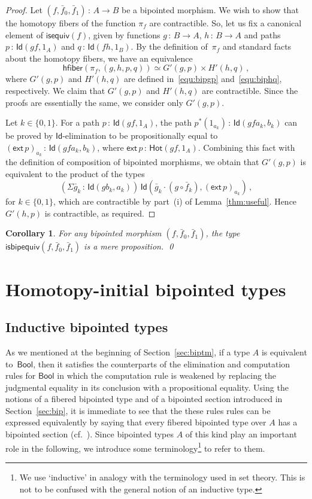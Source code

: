 \documentclass[10pt,a4paper,oneside,reqno]{amsart}
\numberwithin{equation}{section}
\theoremstyle{mythm}
\newtheorem{corollary}[theorem]{Corollary}
\theoremstyle{mydef}
\theoremstyle{myrmk}
\newcommand{\co}{\,{:}\,}
\newcommand{\ct}{\cdot}
\newcommand{\hfiber}{\mathsf{hfiber}}
\newcommand{\isequiv}{\mathsf{isequiv}}
\newcommand{\Hot}{\mathsf{Hot}}
\newcommand{\ext}{\mathsf{ext}}
\newcommand{\Bool}{\mathsf{Bool}}
\newcommand{\Id}{\mathsf{Id}}
\newcommand{\isbipequiv}{\mathsf{isbipequiv}}
\begin{document}
\begin{proof}
Let  $(f, \bar{f}_0, \bar{f}_1) \co A \to B$ be a bipointed morphism. We wish to show that the homotopy fibers
of the function $\pi_f$ are contractible. So, let us fix a canonical element of $\isequiv(f)$, given by functions $g \co B
\to A$, $h \co B \to A$ and paths $p \co \Id(gf, 1_A)$ and $q \co \Id(fh, 1_B)$. By the definition of~$\pi_f$ and standard
facts about the homotopy fibers, we have an equivalence 
\[
\hfiber(\pi_f, (g,h, p, q)) \simeq G'(g,p) \times H'(h,q) \, ,
\]
 where $G'(g,p)$ and $H'(h,q)$ are defined
in~\eqref{equ:bipgp} and~\eqref{equ:biphq}, respectively. 
We claim that $G'(g,p)$ and $H'(h,q)$ are contractible. Since
the proofs are essentially the same, we consider only $G'(g,p)$.  

Let $k \in \{0, 1 \}$. For a path $p \co \Id(gf, 1_A)$, the path $p^*(1_{a_k}) \co \Id( gf a_k, b_k)$ can be proved by $\Id$-elimination to be propositionally equal to $(\ext \, p)_{a_k}\co \Id(gfa_k, b_k)$, where $\ext \, p \co \Hot(gf, 1_A)$. Combining this fact with the definition of composition of bipointed morphisms, we obtain that
$G'(g,p)$ is equivalent to the product of the types
\[
(\Sigma \bar{g}_k \co \Id( gb_k, a_k)) \, \Id ( \bar{g}_k \ct (g \circ \bar{f}_k), (\ext \, p)_{a_k}) \, ,
\]
for $k \in \{0, 1 \}$, which are contractible by part~(i) of Lemma~\ref{thm:useful}. Hence $G'(h,p)$ is contractible, as required.
\end{proof}


\begin{corollary} For any bipointed morphism $(f, \bar{f}_0, \bar{f}_1)$, the type $\isbipequiv(f, \bar{f}_0, \bar{f}_1)$ is a mere proposition. \qed
\end{corollary} 





\section{Homotopy-initial bipointed types} 
\label{sec:homibt}


\subsection*{Inductive bipointed types} 
As we mentioned at the beginning of Section~\ref{sec:biptm}, if a type $A$ is equivalent to~$\Bool$, then 
it satisfies the counterparts of the elimination and computation rules for $\Bool$ in which the computation rule is 
weakened by replacing the judgmental equality in its conclusion with a propositional equality. Using the notions of a fibered bipointed type and of a bipointed section introduced in Section~\ref{sec:bip}, it is immediate to see that the these rules rules can be expressed equivalently by saying  that every fibered  bipointed type over $A$ has a bipointed 
section (cf.~\cite{JoyalA:cathtt}). Since bipointed types $A$ of this kind  play an important role in the following, we introduce some terminology\footnote{We use `inductive' in analogy with the terminology used in set theory. This is not to be confused with the general notion of an inductive type.} to refer to them.
\end{document}
